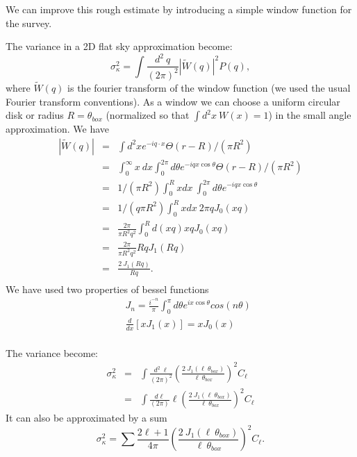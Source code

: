 \documentclass[prd,onecolumn,amsmath,amssymb,floatfix,superscriptaddress,notitlepage]{revtex4-1}
\def\be{\begin{equation}}
\def\ee{\end{equation}}
\def\ba{\begin{eqnarray}}
\def\ea{\end{eqnarray}}
\begin{document}
We can improve this rough estimate by introducing a simple window function for the survey.

The variance in a 2D flat sky approximation become:
\be
\sigma^{2}_{\kappa}=\int \frac{d^{2}~q}{(2\pi)^{2 }}|\tilde W(q)|^{2} P(q),
\ee
where $\tilde W(q)$ is the fourier transform of the window function (we used the usual Fourier transform conventions).
As a window we can choose a uniform circular disk or radius $R=\theta_{box}$ (normalized so that $\int d^{2}x ~W(x)=1$) in the small angle approximation.
We have
\ba
|\tilde W(q)|&=&\int d^{2}x e^{-i q\cdot x} \Theta(r-R)/(\pi R^{2})\\
&=&\int_{0}^{\infty} x~dx \int_{0}^{2\pi} d\theta e^{-i qx\cos\theta} \Theta(r-R)/(\pi R^{2})\\
&=&1/(\pi R^{2}) \int_{0}^{R} xdx~ \int_{0}^{2\pi} d\theta e^{-i qx\cos\theta} \\
&=&1/(q \pi R^{2}) \int_{0}^{R} xdx~ 2\pi q J_{0}(xq) \\
&=&\frac{2\pi}{\pi R^{2} q^{2}}\int_{0}^{R} d(xq) xq J_{0}(xq) \\
&=&\frac{2\pi}{\pi R^{2} q^{2}}Rq J_{1}(Rq) \\
&=&\frac{2~J_{1}(Rq)}{Rq}. \\
\ea
We have used two properties of bessel functions
\ba
&&J_{n}=\frac{i^{-n}}{\pi}\int_{0}^{\pi}d\theta e^{ix\cos\theta}cos(n\theta)\\
&&\frac{d}{dx}[xJ_{1}(x)]=xJ_{0}(x)\\
\ea


The variance become:
\ba \label{eqn:integral}
\sigma_{\kappa}^{2}&=&\int \frac{d^{2}~\ell}{(2\pi)^{2}} \left(\frac{2~J_{1}(\ell~\theta_{box})}{\ell~\theta_{box}}\right)^{2} C_{\ell}\\
&=&\int \frac{d\ell}{(2\pi)} \ell \left(\frac{2~J_{1}(\ell~\theta_{box})}{\ell~\theta_{box}}\right)^{2} C_{\ell}
\ea
It can also be approximated by a sum 
\be \label{eqn:approx}
\sigma_{\kappa}^{2}=\sum \frac{2\ell+1}{4\pi} \left(\frac{2~J_{1}(\ell~\theta_{box})}{\ell~\theta_{box}}\right)^{2} C_{\ell}.
\ee
\end{document}

